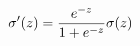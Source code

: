 \documentclass[preview]{standalone}
\begin{document}
\begin{align*}
\special{dvisvgm:raw <g id='unique000'>}\sigma^\prime(z)=\frac{e^{-z}}{1+e^{-z}}\sigma(z)\special{dvisvgm:raw </g>}
\end{align*}
\end{document}
